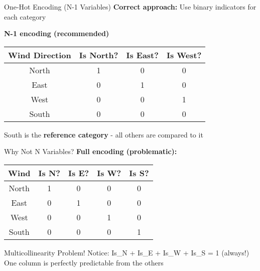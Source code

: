 \documentclass{beamer}
\begin{document}
    \begin{frame}{One-Hot Encoding (N-1 Variables)}
    \textbf{Correct approach:} Use binary indicators for each category
    
    \begin{center}
    \textbf{N-1 encoding (recommended)}\\
    \vspace{1em}
    \begin{tabular}{|c|c|c|c|}
        \hline
        Wind Direction & Is North? & Is East? & Is West?\\
        \hline
        \hline
        North & 1 & 0 & 0 \\
        East & 0 & 1 & 0\\
        West & 0 & 0 & 1\\
        South & 0 & 0 & 0\\
        \hline
    \end{tabular}
    \end{center}
    
    \pause
    \begin{keypointsbox}{}
    South is the \textbf{reference category} - all others are compared to it
    \end{keypointsbox}
    \end{frame}
    
    
    \begin{frame}{Why Not N Variables?}
    \textbf{Full encoding (problematic):}
    
    \begin{center}
    \begin{tabular}{|c|c|c|c|c|}
    \hline
    Wind & Is N? & Is E? & Is W? & Is S?\\
    \hline
    North & 1 & 0 & 0 & 0 \\
    East & 0 & 1 & 0 & 0\\
    West & 0 & 0 & 1 & 0\\
    South & 0 & 0 & 0 & 1\\
    \hline
    \end{tabular}
    \end{center}
    
    \pause
    \begin{alertbox}{Multicollinearity Problem!}
    Notice: Is\_N + Is\_E + Is\_W + Is\_S = 1 (always!)
    \\ One column is perfectly predictable from the others
    \end{alertbox}
    \end{frame}
    
\end{document}

